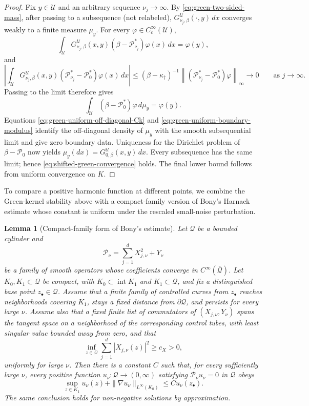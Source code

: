 \documentclass[11pt]{article}
\numberwithin{equation}{section}
\theoremstyle{plain}
\newtheorem{lemma}[theorem]{Lemma}
\theoremstyle{definition}
\theoremstyle{remark}
\begin{document}
\begin{proof}
Fix $y\in\mathscr U$ and an arbitrary sequence $\nu_j\to\infty$.  By
\eqref{eq:green-two-sided-mass}, after passing to a subsequence (not relabeled),
$G_{\nu_j,\beta}^{\mathscr U}(\cdot,y)\,dx$ converges weakly to a finite
measure $\mu_y$.  For every $\varphi\in C_c^\infty(\mathscr U)$,
\[
\int_{\mathscr U}G_{\nu_j,\beta}^{\mathscr U}(x,y)
\left(\beta-\mathscr P_{\nu_j}^*\right)\varphi(x)\,dx=\varphi(y),
\]
and
\[
\left|\int_{\mathscr U}G_{\nu_j,\beta}^{\mathscr U}(x,y)
\left(\mathscr P_{\nu_j}^*-\mathscr P_0^*\right)\varphi(x)\,dx\right|
\le\left(\beta-\kappa_\dagger\right)^{-1}
\left\|\left(\mathscr P_{\nu_j}^*-\mathscr P_0^*\right)\varphi\right\|_\infty
\longrightarrow0
\qquad\text{as }j\to\infty.
\]
Passing to the limit therefore gives
\[
\int_{\mathscr U}\left(\beta-\mathscr P_0^*\right)\varphi\,d\mu_y
=\varphi(y).
\]
Equations \eqref{eq:green-uniform-off-diagonal-Ck} and
\eqref{eq:green-uniform-boundary-modulus} identify the off-diagonal density
of $\mu_y$ with the smooth subsequential limit and give zero boundary data.
Uniqueness for the Dirichlet problem of $\beta-\mathscr P_0$ now yields
$\mu_y(dx)=G_{0,\beta}^{\mathscr U}(x,y)\,dx$.  Every subsequence has the
same limit; hence \eqref{eq:shifted-green-convergence} holds.  The final
lower bound follows from uniform convergence on $K$.
\end{proof}

To compare a positive harmonic function at different points, we combine the
Green-kernel stability above with a compact-family version of Bony's Harnack
estimate whose constant is uniform under the rescaled small-noise
perturbation.

\begin{lemma}[Compact-family form of Bony's estimate]
\label{lem:compact-family-bony}
Let $\mathcal Q$ be a bounded cylinder and
\[
 \mathscr P_\nu=\sum_{j=1}^d X_{j,\nu}^2+Y_\nu
\]
be a family of smooth operators whose coefficients converge in
$C^\infty(\overline{\mathcal Q})$.  Let $K_0,K_1\subset\mathcal Q$ be compact,
with $K_0\subset\operatorname{int}K_1$ and $K_1\subset\mathcal Q$, and fix a
distinguished base point $z_\bullet\in\mathcal Q$.
Assume that a finite family of controlled curves from $z_\bullet$ reaches
neighborhoods covering $K_1$, stays a fixed distance from
$\partial\mathcal Q$, and persists for every large $\nu$.  Assume also that a
fixed finite list of commutators of $(X_{j,\nu},Y_\nu)$ spans the tangent
space on a neighborhood of the corresponding control tubes, with least
singular value bounded away from zero, and that
\[
\inf_{z\in\mathcal Q}\sum_{j=1}^d|X_{j,\nu}(z)|^2\ge c_X>0,
\]
uniformly for large $\nu$.  Then there is a constant $C$ such that, for every sufficiently large
$\nu$, every positive function
$u_\nu:\mathcal Q\to(0,\infty)$ satisfying
$\mathscr P_\nu u_\nu=0$ in $\mathcal Q$ obeys
\[
 \sup_{z\in K_1}u_\nu(z)+\|\nabla u_\nu\|_{L^\infty(K_0)}
 \le C u_\nu(z_\bullet).
\]
The same conclusion holds for non-negative solutions by approximation.
\end{lemma}
\end{document}
